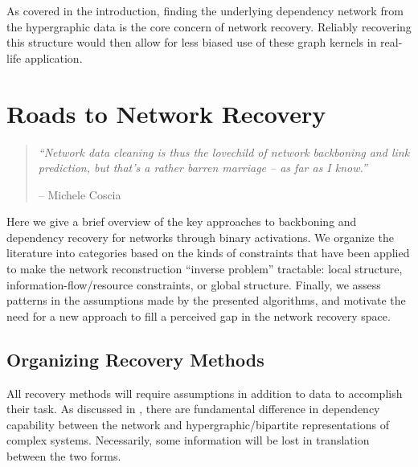 \documentclass[%
	12pt,
		oneside,
		letterpaper
]{book}
\begin{document}
As covered in the introduction, finding the underlying dependency
network from the hypergraphic data is the core concern of network
recovery. Reliably recovering this structure would then allow for less
biased use of these graph kernels in real-life application.

\chapter{Roads to Network Recovery}\label{sec-lit-review}

\begin{flushright}

\begin{minipage}{.7\linewidth}

\singlespacing

\begin{quote}
\emph{``Network data cleaning is thus the lovechild of network
backboning and link prediction, but that's a rather barren marriage --
as far as I know.''}

\hfill -- Michele Coscia\\
\doublespacing
\end{quote}

\end{minipage}

\end{flushright}

Here we give a brief overview of the key approaches to backboning and
dependency recovery for networks through binary activations. We organize
the literature into categories based on the kinds of constraints that
have been applied to make the network reconstruction ``inverse problem''
tractable: local structure, information-flow/resource constraints, or
global structure. Finally, we assess patterns in the assumptions made by
the presented algorithms, and motivate the need for a new approach to
fill a perceived gap in the network recovery space.

\section{Organizing Recovery Methods}\label{organizing-recovery-methods}

All recovery methods will require assumptions in addition to data to
accomplish their task. As discussed in \textcite{WhyHowWhen_Torres2021},
there are fundamental difference in dependency capability between the
network and hypergraphic/bipartite representations of complex systems.
Necessarily, some information will be lost in translation between the
two forms.
\end{document}
